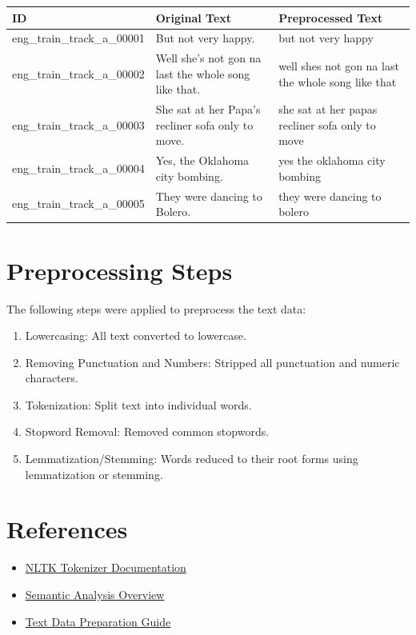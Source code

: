 \documentclass{article}
\begin{document}
\begin{longtable}{|l|p{6cm}|p{6cm}|}
\hline
\textbf{ID} & \textbf{Original Text} & \textbf{Preprocessed Text} \\ \hline
eng\_train\_track\_a\_00001 & But not very happy. & but not very happy \\ \hline
eng\_train\_track\_a\_00002 & Well she’s not gon na last the whole song like that. & well shes not gon na last the whole song like that \\ \hline
eng\_train\_track\_a\_00003 & She sat at her Papa’s recliner sofa only to move. & she sat at her papas recliner sofa only to move \\ \hline
eng\_train\_track\_a\_00004 & Yes, the Oklahoma city bombing. & yes the oklahoma city bombing \\ \hline
eng\_train\_track\_a\_00005 & They were dancing to Bolero. & they were dancing to bolero \\ \hline
\end{longtable}

\section*{Preprocessing Steps}
The following steps were applied to preprocess the text data:
\begin{enumerate}
    \item Lowercasing: All text converted to lowercase.
    \item Removing Punctuation and Numbers: Stripped all punctuation and numeric characters.
    \item Tokenization: Split text into individual words.
    \item Stopword Removal: Removed common stopwords.
    \item Lemmatization/Stemming: Words reduced to their root forms using lemmatization or stemming.
\end{enumerate}

\section*{References}
\begin{itemize}
    \item \href{https://www.nltk.org/api/nltk.tokenize.html}{NLTK Tokenizer Documentation}
    \item \href{https://en.wikipedia.org/wiki/Semantic_analysis_(computational)}{Semantic Analysis Overview}
    \item \href{https://machinelearningmastery.com/prepare-text-data-machine-learning-scikit-learn/}{Text Data Preparation Guide}
\end{itemize}
\end{document}
